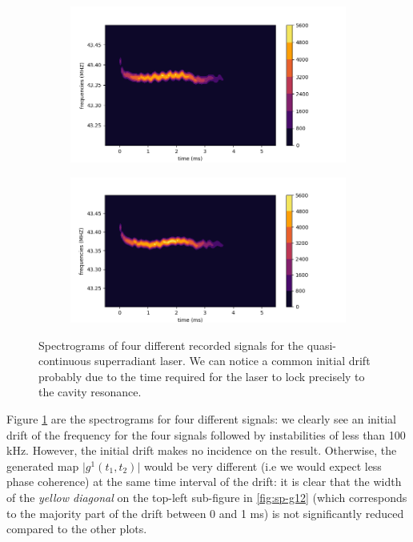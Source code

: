 \documentclass[11pt]{report}
\begin{document}
\begin{figure}[h!]
\centering
\begin{subfigure}{.48\textwidth}
  \centering
  \includegraphics[width=1.1\linewidth]{spec3-44}
\end{subfigure}%
\hspace{1em}%
\begin{subfigure}{.48\textwidth}
  \centering
  \includegraphics[width=1.1\linewidth]{spec3-45}
\end{subfigure}
\caption{Spectrograms of four different recorded signals for the quasi-continuous superradiant laser. We can notice a common initial drift probably due to the time required for the laser to lock precisely to the cavity resonance.}
\label{fig:spectrograms}
\end{figure}

Figure \ref{fig:spectrograms} are the spectrograms for four different signals: we clearly see an initial drift of the frequency for the four signals followed by instabilities of less than 100 kHz. However, the initial drift makes no incidence on the result. Otherwise, the generated map $\vert g^1(t_1, t_2) \vert$ would be very different (i.e we would expect less phase coherence) at the same time interval of the drift: it is clear that the width of the \textit{yellow diagonal} on the top-left sub-figure in \ref{fig:sp-g12} (which corresponds to the majority part of the drift between 0 and 1 ms) is not significantly reduced compared to the other plots.
\end{document}
